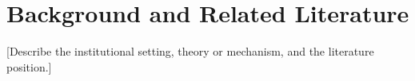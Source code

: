 \section{Background and Related Literature}

[Describe the institutional setting, theory or mechanism, and the literature position.]
